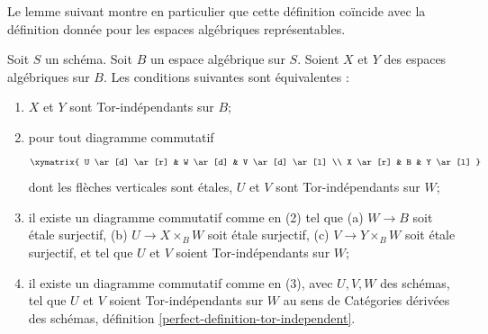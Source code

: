 \noindent
Le lemme suivant montre en particulier que cette d\'efinition co\"incide avec
la d\'efinition donn\'ee pour les espaces alg\'ebriques repr\'esentables.

\begin{lemma}
\label{lemma-tor-independent}
Soit $S$ un sch\'ema. Soit $B$ un espace alg\'ebrique sur $S$. Soient $X$ et
$Y$ des espaces alg\'ebriques sur $B$. Les conditions suivantes sont
\'equivalentes :
\begin{enumerate}
\item $X$ et $Y$ sont Tor-ind\'ependants sur $B$;
\item pour tout diagramme commutatif
$$
\xymatrix{
U \ar[d] \ar[r] & W \ar[d] & V \ar[d] \ar[l] \\
X \ar[r] & B & Y \ar[l]
}
$$
dont les fl\`eches verticales sont \'etales, $U$ et $V$ sont
Tor-ind\'ependants sur $W$;
\item il existe un diagramme commutatif comme en (2) tel que (a) $W\to B$
soit \'etale surjectif, (b) $U\to X\times_BW$ soit \'etale surjectif,
(c) $V\to Y\times_BW$ soit \'etale surjectif, et tel que $U$ et $V$ soient
Tor-ind\'ependants sur $W$;
\item il existe un diagramme commutatif comme en (3), avec $U,V,W$ des
sch\'emas, tel que $U$ et $V$ soient Tor-ind\'ependants sur $W$ au sens de
Cat\'egories d\'eriv\'ees des sch\'emas, d\'efinition
\ref{perfect-definition-tor-independent}.
\end{enumerate}
\end{lemma}

